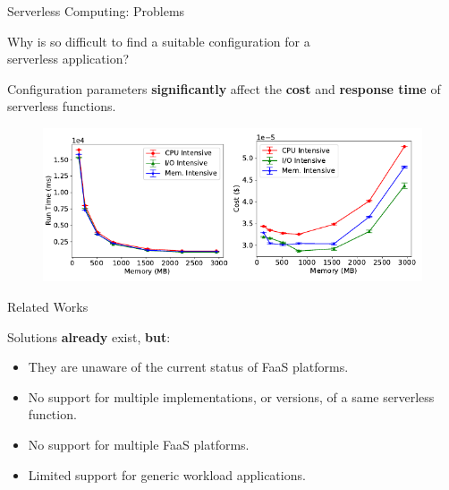 \documentclass[13.5pt]{beamer}
\begin{document}
\begin{frame}{Serverless Computing: Problems}
	
	\begin{block}{}
		\centering
		Why is so difficult to find a suitable configuration for a \\serverless application?
	\end{block}
	\vspace{\baselineskip}
	Configuration parameters \textbf{significantly} affect the \textbf{cost} and \textbf{response time} of serverless functions.
	
	\begin{figure}[h]
		\centering
		\includegraphics[width=\textwidth]{../Images/slideImage1.png}
	\end{figure}
	
\end{frame} 
\begin{frame}{Related Works}

Solutions \textbf{already} exist, \textbf{but}:
\vspace{\baselineskip}
\begin{itemize}
	\item They are unaware of the current status of FaaS platforms.
	\item No support for multiple implementations, or versions, of a same serverless function.
	\item No support for multiple FaaS platforms.
	\item Limited support for generic workload applications.
\end{itemize}

\end{frame} 

\end{document}
